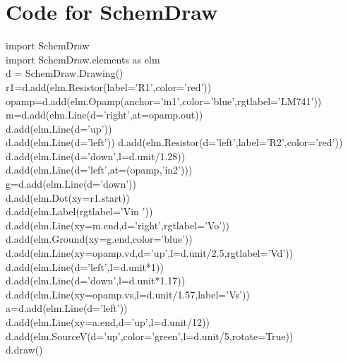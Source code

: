 \documentclass[12pt]{article}
\begin{document}
\section{Code for SchemDraw}
import SchemDraw\\
import SchemDraw.elements as elm\\
[.5cm]
d = SchemDraw.Drawing()\\
[.5cm]
r1=d.add(elm.Resistor(label='R1',color='red'))\\
[.5cm]
opamp=d.add(elm.Opamp(anchor='in1',color='blue',rgtlabel='LM741'))\\
[.5cm]
m=d.add(elm.Line(d='right',at=opamp.out))\\
d.add(elm.Line(d='up'))\\
d.add(elm.Line(d='left'))
d.add(elm.Resistor(d='left',label='R2',color='red'))\\
d.add(elm.Line(d='down',l=d.unit/1.28))\\
d.add(elm.Line(d='left',at=(opamp,'in2')))\\
g=d.add(elm.Line(d='down'))\\
d.add(elm.Dot(xy=r1.start))\\
d.add(elm.Label(rgtlabel='Vin '))\\
d.add(elm.Line(xy=m.end,d='right',rgtlabel='Vo'))\\
d.add(elm.Ground(xy=g.end,color='blue'))\\
d.add(elm.Line(xy=opamp.vd,d='up',l=d.unit/2.5,rgtlabel='Vd'))\\
d.add(elm.Line(d='left',l=d.unit*1))\\
d.add(elm.Line(d='down',l=d.unit*1.17))\\
d.add(elm.Line(xy=opamp.vs,l=d.unit/1.57,label='Vs'))\\
a=d.add(elm.Line(d='left'))\\
d.add(elm.Line(xy=a.end,d='up',l=d.unit/12))\\
d.add(elm.SourceV(d='up',color='green',l=d.unit/5,rotate=True))\\
[.5cm]
d.draw()\\
\pagebreak
\end{document}
